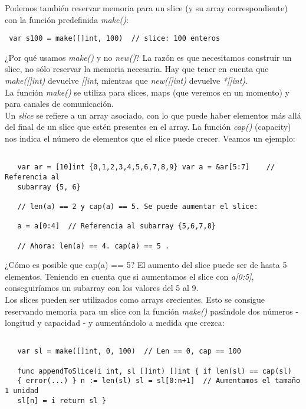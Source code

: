 Podemos también reservar memoria para un slice (y su array correspondiente) con
la función predefinida \textit{make()}:

\begin{verbatim} var s100 = make([]int, 100)  // slice: 100 enteros
\end{verbatim}

¿Por qué usamos \textit{make()} y no \textit{new()}? La razón es que necesitamos
construir un slice, no sólo reservar la memoria necesaria. Hay que tener en
cuenta que \textit{make([]int)} devuelve \textit{[]int}, mientras que
\textit{new([]int)} devuelve \textit{*[]int)}.\\

La función \textit{make()} se utiliza para slices, maps (que veremos en un
momento) y para canales de comunicación.\\

Un \textit{slice} se refiere a un array asociado, con lo que puede haber
elementos más allá del final de un slice que estén presentes en el array. La
función \textit{cap()} (capacity) nos indica el número de elementos que el slice
puede crecer. Veamos un ejemplo:

\begin{verbatim}

   var ar = [10]int {0,1,2,3,4,5,6,7,8,9} var a = &ar[5:7]    // Referencia al
   subarray {5, 6}
   
   // len(a) == 2 y cap(a) == 5. Se puede aumentar el slice:
   
   a = a[0:4]  // Referencia al subarray {5,6,7,8}
   
   // Ahora: len(a) == 4. cap(a) == 5 .  \end{verbatim}

¿Cómo es posible que cap(a) == 5? El aumento del slice puede ser de hasta
5 elementos. Teniendo en cuenta que si aumentamos el slice con \textit{a[0:5]},
conseguiríamos un subarray con los valores del 5 al 9.\\

Los slices pueden ser utilizados como arrays crecientes. Esto se consigue
reservando memoria para un slice con la función \textit{make()} pasándole dos
números - longitud y capacidad - y aumentándolo a medida que crezca:

\begin{verbatim}

   var sl = make([]int, 0, 100)  // Len == 0, cap == 100
   
   func appendToSlice(i int, sl []int) []int { if len(sl) == cap(sl)
   { error(...) } n := len(sl) sl = sl[0:n+1]  // Aumentamos el tamaño 1 unidad
   sl[n] = i return sl } \end{verbatim}

